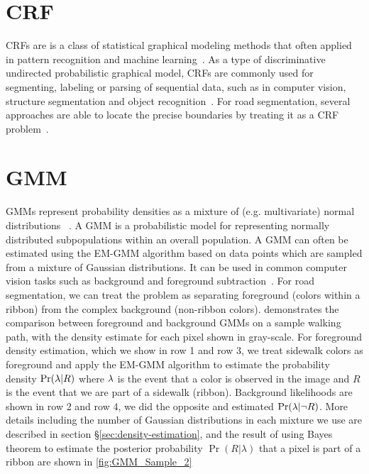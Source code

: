\section{\ac{CRF}} \label{sec:crf}
\acfp{CRF} are is a class of statistical graphical modeling methods that often applied in pattern recognition and machine learning~\cite{MAL-013}. 
As a type of discriminative undirected probabilistic graphical model, \acp{CRF} are commonly used for segmenting, labeling or parsing of sequential data, such as in computer vision, structure segmentation and object recognition~\cite{RuizSarmiento2015UPGMppA, 1315232, lafferty2001conditional}. 
For road segmentation, several approaches are able to locate the precise 
boundaries by treating it as a \ac{CRF} problem~\cite{ActiveContou09, Achanta:149300}. 


\section{\ac{GMM}}\label{sec:gmm}

\acfp{GMM} represent probability densities as a mixture of (e.g. multivariate) normal distributions 
~\cite{sridharan2014gaussian}. A \ac{GMM} is a probabilistic model for representing normally
distributed subpopulations within an overall population. A \ac{GMM} can often  be estimated using
the \ac{EM-GMM} algorithm based on data points which are sampled from a mixture of Gaussian distributions. It can
be used in common computer vision tasks such as background and foreground
subtraction~\cite{1333992}. For road segmentation, we can treat the problem as separating foreground
(colors within a ribbon) from the complex background (non-ribbon colors). 
demonstrates the comparison between foreground and background \acp{GMM} on a sample walking path,
with the density estimate for each pixel shown in gray-scale. For foreground density estimation,
which we show in row 1 and row 3, we treat sidewalk colors as foreground and apply the \ac{EM-GMM}
algorithm to estimate the probability density $\Pr(\lambda{}|R)$ where $\lambda{}$ is the event that a
color is observed in the image and $R$ is the event that we are part of a sidewalk (ribbon).
Background likelihoods are shown in row 2 and row 4, we did the opposite and estimated
$\Pr(\lambda{}|\neg R)$. More details including the number of Gaussian distributions in each mixture
we use are described in section \S\ref{sec:density-estimation}, and the result of using Bayes theorem to estimate the posterior probability 
$\Pr(R|\lambda)$ that a pixel is part of a ribbon are shown in \figurename{}\ref{fig:GMM_Sample_2}


